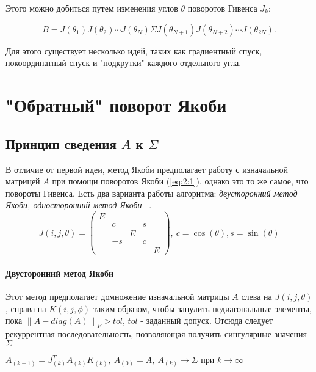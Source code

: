 \documentclass[12pt, a4paper]{report}
\theoremstyle{note}
\begin{document}
Этого можно добиться путем изменения углов \( \theta \) поворотов Гивенса \( J_k \):

\begin{equation}
\tilde{B} = J(\theta_1) J(\theta_2) \cdots J(\theta_N) \Sigma J(\theta_{N+1}) J(\theta_{N+2}) \cdots J(\theta_{2N}).
\end{equation}

Для этого существует несколько идей, таких как градиентный спуск, покоординатный спуск и "подкрутки" каждого отдельного угла.


\newpage
\section{"Обратный" поворот Якоби}

\subsection{Принцип сведения $A$ к $\Sigma$}
В отличие от первой идеи, метод Якоби предполагает работу с изначальной матрицей $A$ при помощи поворотов Якоби (\ref{eq:2:1}), однако это то же самое, что повороты Гивенса. Есть два варианта работы алгоритма:\textit{ двусторонний метод Якоби, односторонний метод Якоби} ~\cite{Dongarra2018}.
\begin{equation} \label{eq:2:1}
    J(i,j,\theta) = 
    \begin{pmatrix}E&&&&\\
        &c&&s\\
        &&E&&\\
        &-s&&c\\
        &&&&E
    \end{pmatrix},\
    c = \cos(\theta), s =\sin(\theta) 
\end{equation}
\paragraph{Двусторонний метод Якоби}
Этот метод предполагает домножение изначальной матрицы $A$ слева на $J(i,j,\theta)$, справа на $K(i,j,\phi)$ таким образом, чтобы занулить недиагональные элементы, пока $\left\| A - diag(A) \right\|_F > tol$, $tol$ - заданный допуск. 
Отсюда следует рекуррентная последовательность, позволяющая получить сингулярные значения $\Sigma$
\begin{center}
    $A_{(k+1)} = J^T_{(k)}A_{(k)}K_{(k)}, \ A_{(0)}= A, \ A_{(k)}\longrightarrow\Sigma \text{ при } k\to\infty$
\end{center}
\end{document}
